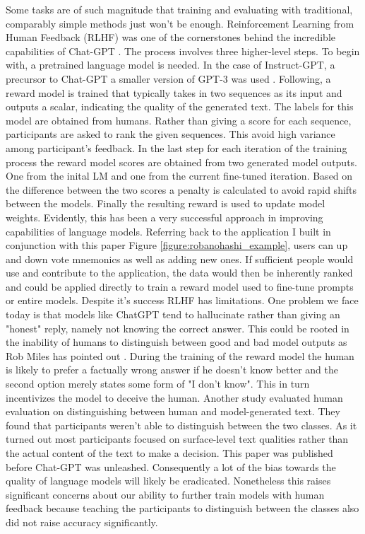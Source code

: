 Some tasks are of such magnitude that training and evaluating with traditional, comparably simple methods just won't be enough. Reinforcement Learning from Human Feedback (RLHF) was one of the cornerstones behind the incredible capabilities of Chat-GPT \cite{lambert2022rlhf}. The process involves three higher-level steps. To begin with, a pretrained language model is needed. In the case of Instruct-GPT, a precursor to Chat-GPT a smaller version of GPT-3 was used \cite{lambert2022rlhf}. Following, a reward model is trained that typically takes in two sequences as its input and outputs a scalar, indicating the quality of the generated text. The labels for this model are obtained from humans. Rather than giving a score for each sequence, participants are asked to rank the given sequences. This avoid high variance among participant's feedback. In the last step for each iteration of the training process the reward model scores are obtained from two generated model outputs. One from the inital LM and one from the current fine-tuned iteration. Based on the difference between the two scores a penalty is calculated to avoid rapid shifts between the models. Finally the resulting reward is used to update model weights. Evidently, this has been a very successful approach in improving capabilities of language models. Referring back to the application I built in conjunction with this paper Figure \ref{figure:robanohashi_example}, users can up and down vote mnemonics as well as adding new ones. If sufficient people would use and contribute to the application, the data would then be inherently ranked and could be applied directly to train a reward model used to fine-tune prompts or entire models. Despite it's success RLHF has limitations. One problem we face today is that models like ChatGPT tend to hallucinate rather than giving an "honest" reply, namely not knowing the correct answer. This could be rooted in the inability of humans to distinguish between good and bad model outputs as Rob Miles has pointed out \cite{miles_chatgpt}. During the training of the reward model the human is likely to prefer a factually wrong answer if he doesn't know better and the second option merely states some form of "I don't know". This in turn incentivizes the model to deceive the human. Another study \cite{clark2020human} evaluated human evaluation on distinguishing between human and model-generated text. They found that participants weren't able to distinguish between the two classes. As it turned out most participants focused on surface-level text qualities rather than the actual content of the text to make a decision. This paper was published before Chat-GPT was unleashed. Consequently a lot of the bias towards the quality of language models will likely be eradicated. Nonetheless this raises significant concerns about our ability to further train models with human feedback because teaching the participants to distinguish between the classes also did not raise accuracy significantly.

